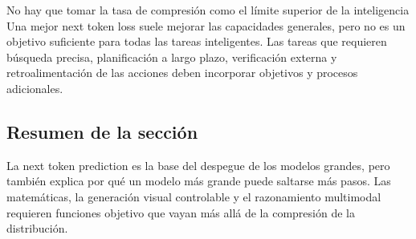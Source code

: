 \begin{warningbox}{No hay que tomar la tasa de compresión como el límite superior de la inteligencia}
Una mejor next token loss suele mejorar las capacidades generales, pero no es un objetivo suficiente para todas las tareas inteligentes. Las tareas que requieren búsqueda precisa, planificación a largo plazo, verificación externa y retroalimentación de las acciones deben incorporar objetivos y procesos adicionales.
\end{warningbox}

\subsection{Resumen de la sección}

La next token prediction es la base del despegue de los modelos grandes, pero también explica por qué un modelo más grande puede saltarse más pasos. Las matemáticas, la generación visual controlable y el razonamiento multimodal requieren funciones objetivo que vayan más allá de la compresión de la distribución.
